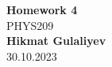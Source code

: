 \begin{titlepage}
    \begin{center}
    {\fontsize{40}{48}\selectfont \bfseries Homework 4} 
    \\\vspace{20pt}
    {\LARGE PHYS209} \\
    \vspace{20pt}
    \textbf{Hikmat Gulaliyev}
    \vspace{8pt}
    \\ 30.10.2023
    \end{center}
\end{titlepage}